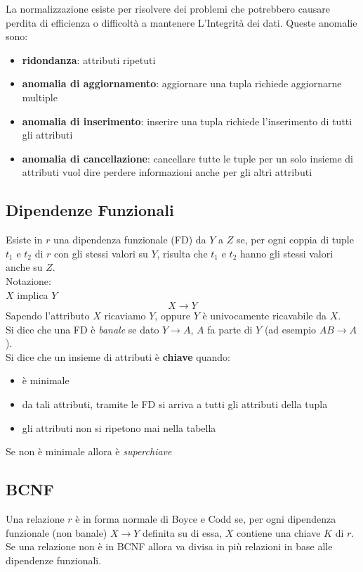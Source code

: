 La normalizzazione esiste per risolvere dei problemi che potrebbero causare perdita di efficienza o difficoltà a mantenere L'Integrità dei dati. Queste anomalie sono:
\begin{itemize}
    \item \textbf{ridondanza}: attributi ripetuti
    \item \textbf{anomalia di aggiornamento}: aggiornare una tupla richiede aggiornarne multiple
    \item \textbf{anomalia di inserimento}: inserire una tupla richiede l'inserimento di tutti gli attributi
    \item \textbf{anomalia di cancellazione}: cancellare tutte le tuple per un solo insieme di attributi vuol dire perdere informazioni anche per gli altri attributi
\end{itemize}

\subsection{Dipendenze Funzionali}
Esiste in $r$ una dipendenza funzionale (FD) da $Y$ a $Z$ se, per ogni coppia di tuple $t_1$ e $t_2$ di $r$ con gli stessi valori su $Y$, risulta che $t_1$ e $t_2$ hanno gli stessi valori anche su $Z$.\\
Notazione:\\
$X$ implica $Y$
$$X \rightarrow Y$$
Sapendo l'attributo $X$ ricaviamo $Y$, oppure $Y$ \`e univocamente ricavabile da $X$.\\
Si dice che una FD \`e \textit{banale} se dato $Y \rightarrow A$, $A$ fa parte di $Y$ (ad esempio $A B \rightarrow A$).\\
Si dice che un insieme di attributi \`e \textbf{chiave} quando:
\begin{itemize}
    \item \`e minimale
    \item da tali attributi, tramite le FD si arriva a tutti gli attributi della tupla
    \item gli attributi non si ripetono mai nella tabella
\end{itemize}
Se non \`e minimale allora \`e \textit{superchiave}

\subsection{BCNF}
Una relazione $r$ \`e in forma normale di Boyce e Codd se, per ogni dipendenza funzionale (non banale) $X \rightarrow Y$ definita su di essa, $X$ contiene una chiave $K$ di $r$.\\
Se una relazione non \`e in BCNF allora va divisa in più relazioni in base alle dipendenze funzionali.

